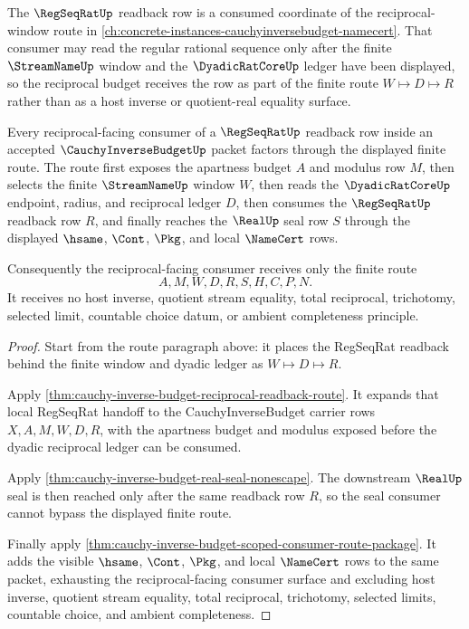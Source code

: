 The $\RegSeqRatUp$ readback row is a consumed coordinate of the reciprocal-window route in \autoref{ch:concrete-instances-cauchyinversebudget-namecert}. That consumer may read the regular rational sequence only after the finite $\StreamNameUp$ window and the $\DyadicRatCoreUp$ ledger have been displayed, so the reciprocal budget receives the row as part of the finite route $W \longmapsto D \longmapsto R$ rather than as a host inverse or quotient-real equality surface.

\begin{theorem}\label{thm:regseqrat-reciprocal-budget-visible-route-exhaustion}
Every reciprocal-facing consumer of a $\RegSeqRatUp$ readback row inside an accepted $\CauchyInverseBudgetUp$ packet factors through the displayed finite route. The route first exposes the apartness budget $A$ and modulus row $M$, then selects the finite $\StreamNameUp$ window $W$, then reads the $\DyadicRatCoreUp$ endpoint, radius, and reciprocal ledger $D$, then consumes the $\RegSeqRatUp$ readback row $R$, and finally reaches the $\RealUp$ seal row $S$ through the displayed $\hsame$, $\Cont$, $\Pkg$, and local $\NameCert$ rows.

Consequently the reciprocal-facing consumer receives only the finite route
$$
A,M,W,D,R,S,H,C,P,N.
$$
It receives no host inverse, quotient stream equality, total reciprocal, trichotomy, selected limit, countable choice datum, or ambient completeness principle.
\end{theorem}
\begin{proof}
Start from the route paragraph above: it places the RegSeqRat readback behind the finite window and dyadic ledger as $W \longmapsto D \longmapsto R$.

Apply \autoref{thm:cauchy-inverse-budget-reciprocal-readback-route}. It expands that local RegSeqRat handoff to the CauchyInverseBudget carrier rows $X,A,M,W,D,R$, with the apartness budget and modulus exposed before the dyadic reciprocal ledger can be consumed.

Apply \autoref{thm:cauchy-inverse-budget-real-seal-nonescape}. The downstream $\RealUp$ seal is then reached only after the same readback row $R$, so the seal consumer cannot bypass the displayed finite route.

Finally apply \autoref{thm:cauchy-inverse-budget-scoped-consumer-route-package}. It adds the visible $\hsame$, $\Cont$, $\Pkg$, and local $\NameCert$ rows to the same packet, exhausting the reciprocal-facing consumer surface and excluding host inverse, quotient stream equality, total reciprocal, trichotomy, selected limits, countable choice, and ambient completeness.
\end{proof}
